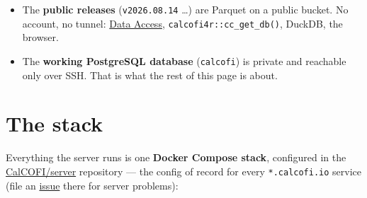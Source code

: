 \documentclass[
  letterpaper,
  DIV=11,
  numbers=noendperiod]{scrreprt}
\providecommand{\tightlist}{%
  \setlength{\itemsep}{0pt}\setlength{\parskip}{0pt}}
\begin{document}
\begin{tcolorbox}[enhanced jigsaw, arc=.35mm, colback=white, left=2mm, leftrule=.75mm, titlerule=0mm, bottomrule=.15mm, colbacktitle=quarto-callout-note-color!10!white, colframe=quarto-callout-note-color-frame, rightrule=.15mm, title=\textcolor{quarto-callout-note-color}{\faInfo}\hspace{0.5em}{Two databases, two access paths}, breakable, opacityback=0, toptitle=1mm, toprule=.15mm, coltitle=black, bottomtitle=1mm, opacitybacktitle=0.6]

\begin{itemize}
\tightlist
\item
  The \textbf{public releases} (\texttt{v2026.08.14} \ldots) are Parquet
  on a public bucket. No account, no tunnel: \hyperref[data-access]{Data
  Access}, \texttt{calcofi4r::cc\_get\_db()}, DuckDB, the browser.
\item
  The \textbf{working PostgreSQL database} (\texttt{calcofi}) is private
  and reachable only over SSH. That is what the rest of this page is
  about.
\end{itemize}

\end{tcolorbox}

\section{The stack}\label{sec-server-stack}

Everything the server runs is one \textbf{Docker Compose stack},
configured in the
\href{https://github.com/CalCOFI/server}{CalCOFI/server} repository ---
the config of record for every \texttt{*.calcofi.io} service (file an
\href{https://github.com/CalCOFI/server/issues}{issue} there for server
problems):
\end{document}
